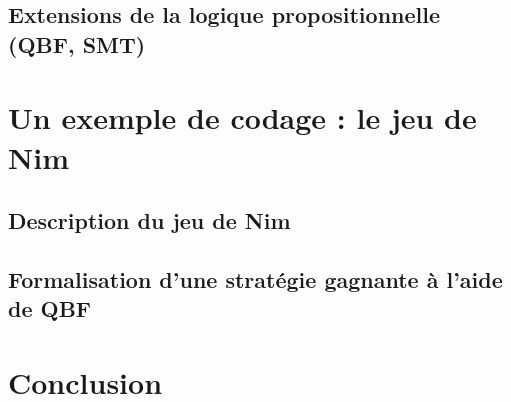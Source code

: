 \documentclass[a4paper,12pt,oneside,fullcap,chkrefs,webpdf64,m3L,cmr,mathcenter,noSciVerse,amsmath]{extbook}
\begin{document}
\subsection{Extensions de la logique propositionnelle (QBF, SMT)}

\section{Un exemple de codage : le jeu de Nim}
\subsection{Description du jeu de Nim}

\subsection{Formalisation d'une stratégie gagnante à l'aide de QBF}









\section{Conclusion}
\end{document}
